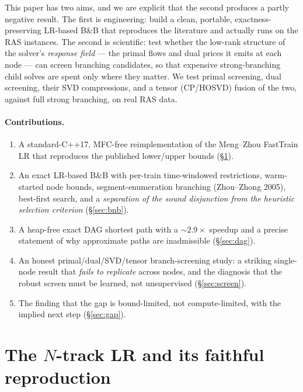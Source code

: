 \documentclass[11pt]{article}
\begin{document}
This paper has two aims, and we are explicit that the second produces a partly negative
result. The first is engineering: build a clean, portable, exactness-preserving LR-based
B\&B that reproduces the literature and actually runs on the RAS instances. The second is
scientific: test whether the low-rank structure of the solver's \emph{response field} ---
the primal flows and dual prices it emits at each node --- can screen branching candidates,
so that expensive strong-branching child solves are spent only where they matter. We test
primal screening, dual screening, their SVD compressions, and a tensor (CP/HOSVD) fusion of
the two, against full strong branching, on real RAS data.

\paragraph{Contributions.}
\begin{enumerate}\itemsep1pt
\item A standard-C++17, MFC-free reimplementation of the Meng--Zhou FastTrain LR that
reproduces the published lower/upper bounds (\S\ref{sec:lr}).
\item An exact LR-based B\&B with per-train time-windowed restrictions, warm-started node
bounds, segment-enumeration branching (Zhou--Zhong 2005), best-first search, and a
\emph{separation of the sound disjunction from the heuristic selection criterion}
(\S\ref{sec:bnb}).
\item A heap-free exact DAG shortest path with a $\sim\!2.9\times$ speedup and a precise
statement of why approximate paths are inadmissible (\S\ref{sec:dag}).
\item An honest primal/dual/SVD/tensor branch-screening study: a striking single-node result
that \emph{fails to replicate} across nodes, and the diagnosis that the robust screen must be
learned, not unsupervised (\S\ref{sec:screen}).
\item The finding that the gap is bound-limited, not compute-limited, with the implied next
step (\S\ref{sec:gap}).
\end{enumerate}

\section{The $N$-track LR and its faithful reproduction}\label{sec:lr}
\end{document}
